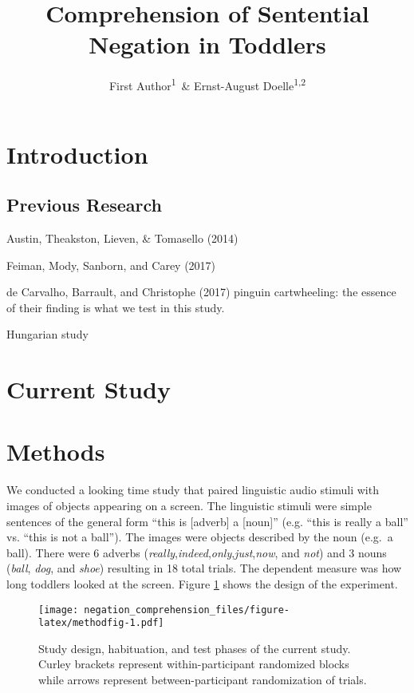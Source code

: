 \documentclass[man,floatsintext]{apa6}
\title{Comprehension of Sentential Negation in Toddlers}
\author{First Author\textsuperscript{1}~\& Ernst-August Doelle\textsuperscript{1,2}}
\date{}
\affiliation{
\vspace{0.5cm}
\textsuperscript{1} Wilhelm-Wundt-University\\\textsuperscript{2} Konstanz Business School}
\begin{document}
\maketitle

\hypertarget{introduction}{%
\section{Introduction}\label{introduction}}

\hypertarget{previous-research}{%
\subsection{Previous Research}\label{previous-research}}

Austin, Theakston, Lieven, \& Tomasello (2014)

Feiman, Mody, Sanborn, and Carey (2017)

de Carvalho, Barrault, and Christophe (2017) pinguin cartwheeling: the essence of their finding is what we test in this study.

Hungarian study

\hypertarget{current-study}{%
\section{Current Study}\label{current-study}}

\hypertarget{methods}{%
\section{Methods}\label{methods}}

We conducted a looking time study that paired linguistic audio stimuli with images of objects appearing on a screen. The linguistic stimuli were simple sentences of the general form \enquote{this is {[}adverb{]} a {[}noun{]}} (e.g. \enquote{this is really a ball} vs. \enquote{this is not a ball}). The images were objects described by the noun (e.g.~a ball). There were 6 adverbs (\emph{really},\emph{indeed},\emph{only},\emph{just},\emph{now}, and \emph{not}) and 3 nouns (\emph{ball}, \emph{dog}, and \emph{shoe}) resulting in 18 total trials. The dependent measure was how long toddlers looked at the screen. Figure \ref{fig:methodfig} shows the design of the experiment.

\begin{figure}
\centering
\texttt{[image: negation\_comprehension\_files/figure-latex/methodfig-1.pdf]}
\caption{\label{fig:methodfig}Study design, habituation, and test phases of the current study. Curley brackets represent within-participant randomized blocks while arrows represent between-participant randomization of trials.}
\end{figure}
\end{document}
